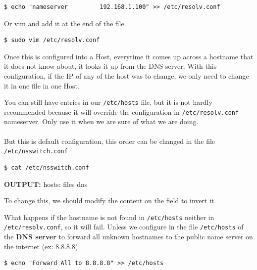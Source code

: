 \documentclass{article}
\newenvironment{blocktemplateIII}[1]{%
    \tcolorbox[beamer,%
    noparskip,breakable,
    ,colframe=Red,%
    colbacklower=LimeGreen!75!LightGreen,%
    title=#1]}%
    {\endtcolorbox}
\newenvironment{codetemplate}[1][]{%
  \mybasecolorbox[#1]
  \itshape
}{%
  \endmybasecolorbox
}
\begin{document}
\begin{codetemplate}{}
\begin{verbatim}
$ echo "nameserver         192.168.1.100" >> /etc/resolv.conf
\end{verbatim}
\end{codetemplate}

Or vim and add it at the end of the file.
\begin{codetemplate}{}
\begin{verbatim}
$ sudo vim /etc/resolv.conf
\end{verbatim}
\end{codetemplate}

Once this is configured into a Host, everytime it comes up across a hostname that it does not know about, it looks it up from the DNS server. With this configuration, if the IP of any of the host was to change, we only need to change it in one file in one Host.

\begin{blocktemplateIII}{WARNING}
You can still have entries in our \verb|/etc/hosts| file, but it is not hardly recommended because it will override the configuration in \verb|/etc/resolv.conf| nameserver. Only use it when we are sure of what we are doing.
\\\\
But this is default configuration, this order can be changed in the file \verb|/etc/nsswitch.conf|
\begin{codetemplate}{}
\begin{verbatim}
$ cat /etc/nsswitch.conf
\end{verbatim}
\end{codetemplate}

\textbf{OUTPUT:} hosts:    files dns

To change this, we should modify the content on the field to invert it.
\end{blocktemplateIII}

What happens if the hostname is not found in \verb|/etc/hosts| neither in \verb|/etc/resolv.conf|, so it will fail. Unless we configure in the file \verb|/etc/hosts| of the \textbf{DNS server} to forward all unknown hostnames to the public name server on the internet (ex: 8.8.8.8).

\begin{codetemplate}{}
\begin{verbatim}
$ echo "Forward All to 8.8.8.8" >> /etc/hosts
\end{verbatim}
\end{codetemplate}
\end{document}
